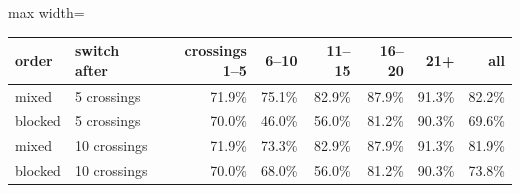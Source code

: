 \begin{adjustbox}{max width=\textwidth}
{\footnotesize
\begin{tabular}{llrrrrrr}
\toprule
\textbf{order} & \textbf{switch after} & \textbf{crossings 1--5} & \textbf{6--10} & \textbf{11--15} & \textbf{16--20} & \textbf{21+} & \textbf{all} \\
\midrule
mixed & 5 crossings & 71.9\% & 75.1\% & 82.9\% & 87.9\% & 91.3\% & 82.2\% \\
blocked & 5 crossings & 70.0\% & 46.0\% & 56.0\% & 81.2\% & 90.3\% & 69.6\% \\
mixed & 10 crossings & 71.9\% & 73.3\% & 82.9\% & 87.9\% & 91.3\% & 81.9\% \\
blocked & 10 crossings & 70.0\% & 68.0\% & 56.0\% & 81.2\% & 90.3\% & 73.8\% \\
\bottomrule
\end{tabular}
}
\end{adjustbox}
